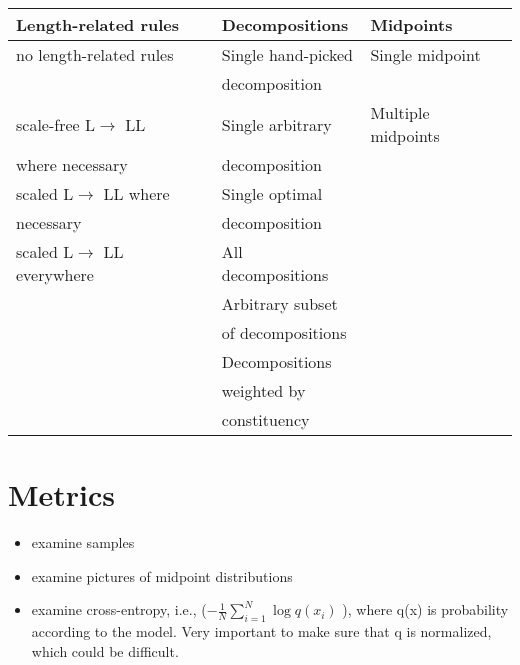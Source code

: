 \documentclass{book}
\begin{document}
\begin{center}
\begin{tabular}{lll}
\hline
 \textbf{Length-related rules}  &  \textbf{Decompositions}  &  \textbf{Midpoints}  \\
\hline
 no length-related rules        &  Single hand-picked       &  Single midpoint     \\
                                &  decomposition            &                      \\
\hline
 scale-free L$\to$ LL           &  Single arbitrary         &  Multiple midpoints  \\
 where necessary                &  decomposition            &                      \\
\hline
 scaled L$\to$ LL where         &  Single optimal           &                      \\
 necessary                      &  decomposition            &                      \\
\hline
 scaled L$\to$ LL everywhere    &  All decompositions       &                      \\
\hline
                                &  Arbitrary subset         &                      \\
                                &  of decompositions        &                      \\
\hline
                                &  Decompositions           &                      \\
                                &  weighted by              &                      \\
                                &  constituency             &                      \\
\hline
\end{tabular}
\end{center}
\section{Metrics}
\label{sec-7_7}

\begin{itemize}
\item examine samples
\item examine pictures of midpoint distributions
\item examine cross-entropy, i.e., ($-\frac{1}{N} \sum_{i=1}^N
    \log q(x_i)$ ), where q(x) is probability according to the
    model. Very important to make sure that q is normalized, which
    could be difficult.
\end{itemize}
\end{document}

